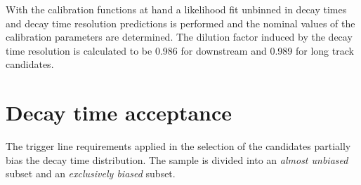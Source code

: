 With the calibration functions at hand a likelihood fit unbinned in decay
times and decay time resolution predictions is performed and the nominal
values of the calibration parameters are determined. The dilution factor
induced by the decay time resolution is calculated to be \num{0.986} for
downstream and \num{0.989} for long track candidates.

\section{Decay time acceptance}
\label{sec:bd2jpsiks:decaytime:acceptance}

The trigger line requirements applied in the selection of the \BdToJPsiKS
candidates partially bias the decay time distribution. The sample is divided
into an \emph{almost unbiased} subset and an \emph{exclusively biased} subset.